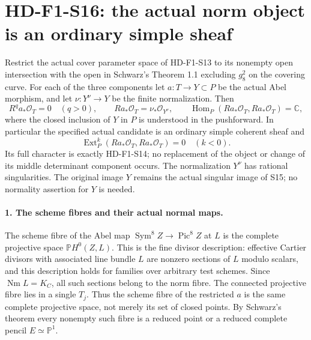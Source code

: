 
\section[HD-F1-S16: the ordinary simple norm sheaf]{HD-F1-S16: the actual norm object is an ordinary simple sheaf}
\label{sec:f1-norm-fourfold-derived}

Restrict the actual cover parameter space of HD-F1-S13 to its nonempty
open intersection with the open in Schwarz's Theorem 1.1 excluding
$g^2_8$ on the covering curve. For each of the three components let
$a:T\to Y\subset P$ be the actual Abel morphism, and let
$\nu:Y^\nu\to Y$ be the finite normalization. Then
\[
 R^qa_*\mathcal O_T=0\quad(q>0),\qquad
 Ra_*\mathcal O_T=\nu_*\mathcal O_{Y^\nu},\qquad
 \operatorname{Hom}_P(Ra_*\mathcal O_T,Ra_*\mathcal O_T)=\mathbb C,
 \tag{F1S16.1}
\]
where the closed inclusion of $Y$ in $P$ is understood in the
pushforward. In particular the specified actual candidate is an
ordinary simple coherent sheaf and
\[
 \operatorname{Ext}^k_P(Ra_*\mathcal O_T,Ra_*\mathcal O_T)=0
                           \quad(k<0).
 \tag{F1S16.2}
\]
Its full character is exactly HD-F1-S14; no replacement of the object
or change of its middle determinant component occurs. The normalization
$Y^\nu$ has rational singularities. The original image $Y$ remains the
actual singular image of S15; no normality assertion for $Y$ is needed.

\paragraph{1. The scheme fibres and their actual normal maps.}
The scheme fibre of the Abel map $\operatorname{Sym}^8Z\to
\operatorname{Pic}^8Z$ at $L$ is the complete projective space
$\mathbb P H^0(Z,L)$. This is the fine divisor description: effective
Cartier divisors with associated line bundle $L$ are nonzero sections
of $L$ modulo scalars, and this description holds for families over
arbitrary test schemes. Since $\operatorname{Nm}L=K_C$, all such
sections belong to the norm fibre. The connected projective fibre lies
in a single $T_j$. Thus the scheme fibre of the restricted $a$ is the
same complete projective space, not merely its set of closed points.
By Schwarz's theorem every nonempty such fibre is a reduced point or
a reduced complete pencil $E\simeq\mathbb P^1$.

